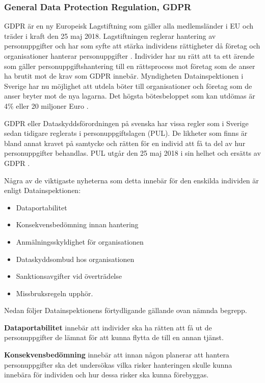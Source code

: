 \documentclass[swedish, a4paper,12pt]{article}
\begin{document}
\subsubsection{General Data Protection Regulation, GDPR}
GDPR är en ny Europeisk Lagstiftning som gäller alla medlemsländer i EU och träder i kraft den 25 maj 2018.
Lagstiftningen reglerar hantering av personuppgifter och har som syfte att stärka individens rättigheter då företag och organisationer hanterar personuppgifter \cite{GDPRibm} \cite{GDPRdatainspektionen}.
Individer har nu rätt att ta ett ärende som gäller personuppgiftshantering till en rättsprocess mot företag som de anser ha brutit mot de krav som GDPR innebär.
Myndigheten Datainspektionen i Sverige har nu möjlighet att utdela böter till organisationer och företag som de anser bryter mot de nya lagarna. Det högsta bötesbeloppet som kan utdömas är 4\% eller 20 miljoner Euro \cite{GDPRibm}.

GDPR eller Dataskyddsförordningen på svenska har vissa regler som i Sverige sedan tidigare reglerats i personuppgiftslagen (PUL). De likheter som finns är bland annat kravet på samtycke och rätten för en individ att få ta del av hur personuppgifter behandlas. PUL utgår den 25 maj 2018 i sin helhet och ersätts av GDPR \cite{GDPRdatainspektionen}.

Några av de viktigaste nyheterna som detta innebär för den enskilda individen är enligt Datainspektionen\cite{GDPRdatainspektionen}:
\begin{itemize}
  \item Dataportabilitet
  \item Konsekvensbedömning innan hantering
  \item Anmälningsskyldighet för organisationen
  \item Dataskyddsombud hos organisationen
  \item Sanktionsavgifter vid överträdelse
  \item Missbruksregeln upphör.
\end{itemize}
\newpage
Nedan följer Datainspektionens \cite{GDPRdatainspektionen} förtydligande gällande ovan nämnda begrepp.

\textbf{Dataportabilitet} innebär att individer ska ha rätten att få ut de personuppgifter de lämnat för att kunna flytta de till en annan tjänst.

\textbf{Konsekvensbedömning} innebär att innan någon planerar att hantera personuppgifter ska det undersökas vilka risker hanteringen skulle kunna innebära för individen och hur dessa risker ska kunna förebyggas.
\end{document}
